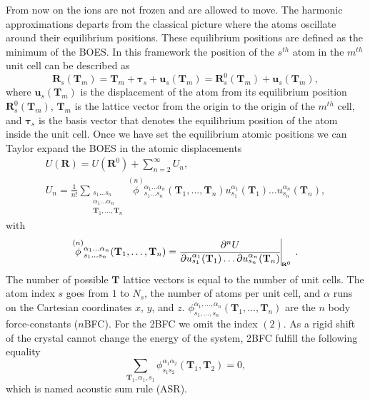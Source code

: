 From now on the ions are not frozen and are allowed to move. The harmonic approximations departs from the classical picture where the atoms oscillate around their equilibrium positions. These equilibrium positions are defined as 
the minimum of the BOES. In this framework the position of the $s^{th}$ atom in the $m^{th}$ unit cell can be described as
\begin{equation}
 \mathbf{R}_{s}(\mathbf{T}_{m})=\mathbf{T}_{m}+\boldsymbol{\tau}_{s}+\mathbf{u}_{s}(\mathbf{T}_{m})=\mathbf{R}_{s}^{0}(\mathbf{T}_{m})+\mathbf{u}_{s}(\mathbf{T}_{m}),
\end{equation}  
where $\mathbf{u}_{s}(\mathbf{T}_{m})$ is the displacement of the atom from its equilibrium position $\mathbf{R}_{s}^{0}(\mathbf{T}_{m})$, $\mathbf{T}_{m}$ is the lattice vector from the origin to the origin of the $m^{th}$ 
cell, and $\boldsymbol{\tau}_{s}$ is the basis vector that denotes the equilibrium position of the atom inside the unit cell. Once we have set the equilibrium atomic positions we can Taylor expand the BOES in the atomic displacements
\begin{multline}
 \label{taylor-expansion}
 U(\mathbf{R})=U(\mathbf{R}^{0})+\sum_{n=2}^{\infty}U_{n}, \\ U_{n}=\frac{1}{n!}\sum\limits_{\substack{s_{1}\dots s_{n} \\ \alpha_{1}\dots\alpha_{n} \\ \mathbf{T}_{1},\dots,\mathbf{T}_{n}}} 
 \overset{(n)}{\phi}{}_{s_{1}\dots s_{n}}^{\alpha_{1}\dots\alpha_{n}}(\mathbf{T}_{1},\dots,\mathbf{T}_{n})u_{s_{1}}^{\alpha_{1}}(\mathbf{T}_{1})\dots u_{s_{n}}^{\alpha_{n}}(\mathbf{T}_{n}),
\end{multline}
with
\begin{equation}
 \label{perturbative-nbfc}
 \overset{(n)}{\phi}{}_{s_{1}\dots s_{n}}^{\alpha_{1}\dots\alpha_{n}}(\mathbf{T}_{1},\dots,\mathbf{T}_{n})=\frac{\partial^{n}U}{\partial u_{s_{1}}^{\alpha_{1}}(\mathbf{T}_{1})\dots\partial u_{s_{n}}^{
 \alpha_{n}}(\mathbf{T}_{n})}\vline_{_{_{_{_{_{_{_{_{\mathbf{R}^{0}}}}}}}}}}.
\end{equation}
The number of possible $\mathbf{T}$ lattice vectors is equal to the number of unit cells. The atom index $s$ goes from $1$ to $N_{s}$, the number of atoms per unit cell, and $\alpha$ runs on the Cartesian coordinates $x$, $y$, and 
$z$. $\phi_{s_{1},\dots,s_{n}}^{\alpha_{1},\dots,\alpha_{n}}(\mathbf{T}_{1},\dots,\mathbf{T}_{n})$ are the $n$ body force-constants ($n$BFC). For the 2BFC we omit the index $(2)$. As a rigid shift of the crystal cannot change the energy of the system, 2BFC fulfill the following equality
\begin{equation}
\label{acoustic-sum-rule}
\sum_{\mathbf{T}_{1},\alpha_{1},s_{1}}\phi_{s_{1}s_{2}}^{\alpha_{1}\alpha_{2}}(\mathbf{T}_{1},\mathbf{T}_{2})=0,
\end{equation}
which is named acoustic sum rule (ASR). \\

